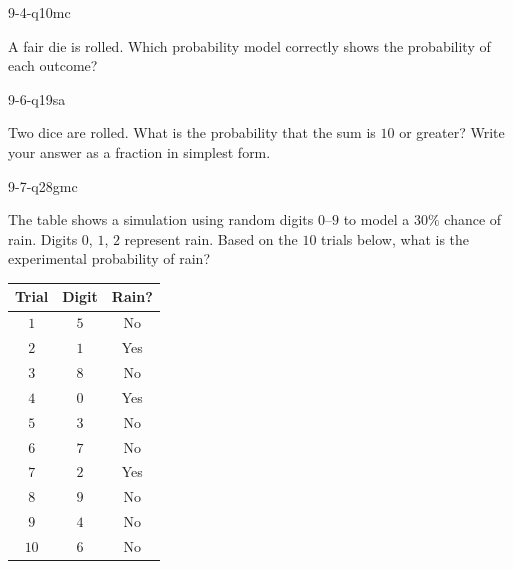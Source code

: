 \begin{practiceQuestion}{9-4-q10}{mc}
\begin{questionText}
A fair die is rolled. Which probability model correctly shows the probability of each outcome?
\end{questionText}
\end{practiceQuestion}

\begin{practiceQuestion}{9-6-q19}{sa}
\begin{questionText}
Two dice are rolled. What is the probability that the sum is $10$ or greater? Write your answer as a fraction in simplest form.
\end{questionText}
\end{practiceQuestion}

\begin{practiceQuestion}{9-7-q28}{gmc}
\begin{questionText}
The table shows a simulation using random digits $0$--$9$ to model a $30\%$ chance of rain. Digits $0$, $1$, $2$ represent rain. Based on the $10$ trials below, what is the experimental probability of rain?

\begin{center}
\begin{tabular}{|c|c|c|}
\hline
\textbf{Trial} & \textbf{Digit} & \textbf{Rain?} \\
\hline
$1$ & $5$ & No \\
\hline
$2$ & $1$ & Yes \\
\hline
$3$ & $8$ & No \\
\hline
$4$ & $0$ & Yes \\
\hline
$5$ & $3$ & No \\
\hline
$6$ & $7$ & No \\
\hline
$7$ & $2$ & Yes \\
\hline
$8$ & $9$ & No \\
\hline
$9$ & $4$ & No \\
\hline
$10$ & $6$ & No \\
\hline
\end{tabular}
\end{center}
\end{questionText}
\end{practiceQuestion}
